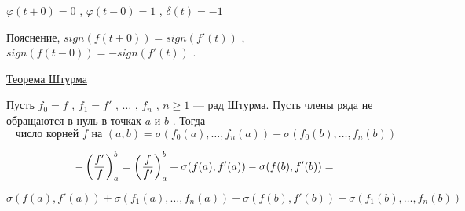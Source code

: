 \vspace


\vspace

\( \varphi(t+0) = 0 \) , \( \varphi(t-0) = 1 \) , \( \delta(t) = -1 \)

\vspace

Пояснение, \( sign(f(t+0)) = sign(f'(t)) \) , \( sign(f(t-0)) = - sign(f'(t)) \) .

\SSendp

\SSsect[!!] \underline{Теорема Штурма}

\vspace

Пусть \( f_0 = f \) , \( f_1=f' \) , \( \dots \) , \( f_n \) , \( n \geqslant 1 \) --- рад Штурма.
Пусть члены ряда не обращаются в нуль в точках \( a \) и \( b \) .
Тогда 
\[ \text{ число корней } f \text{ на } (a,b) = \sigma(f_0(a),\dots,f_n(a)) - \sigma(f_0(b),\dots,f_n(b)) \]

\SSproof

\[ - \left( \frac{f'}{f} \right)^b_a = \left( \frac{f}{f'} \right)^b_a + \sigma(f(a),f'(a)) - \sigma(f(b),f'(b)) = \]

\[ \sigma(f(a),f'(a)) + \sigma(f_1(a),\dots,f_n(a)) - \sigma(f(b),f'(b)) - \sigma(f_1(b),\dots,f_n(b)) \]

\SSendp




